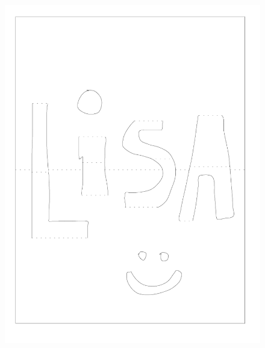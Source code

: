 \begin{figure}[htbp]
\centering
\includegraphics{figures/91_Appendix_DAX_Creations/lisa_name.png}
\caption{}
\end{figure}


